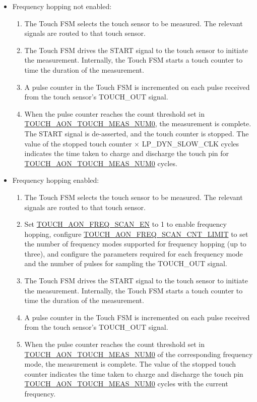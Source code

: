 \documentclass[main\_\_EN.tex]{subfiles}
\begin{document}
\begin{itemize}
    \item Frequency hopping not enabled:
        \begin{enumerate}
            \item The Touch FSM selects the touch sensor to be measured. The relevant signals are routed to that touch sensor.
            \item The Touch FSM drives the START signal to the touch sensor to initiate the measurement. Internally, the Touch FSM starts a touch counter to time the duration of the measurement.
            \item A pulse counter in the Touch FSM is incremented on each pulse received from the touch sensor's TOUCH\_OUT signal.
            \item When the pulse counter reaches the count threshold set in \hyperref[fielddesc:TOUCHAONTOUCHMEASNUM0]{TOUCH\_AON\_TOUCH\_MEAS\_NUM0}, the measurement is complete. The START signal is de-asserted, and the touch counter is stopped. The value of the stopped touch counter × LP\_DYN\_SLOW\_CLK cycles indicates the time taken to charge and discharge the touch pin for \hyperref[fielddesc:TOUCHAONTOUCHMEASNUM0]{TOUCH\_AON\_TOUCH\_MEAS\_NUM0} cycles.
        \end{enumerate}
    \item Frequency hopping enabled:
        \begin{enumerate}
            \item The Touch FSM selects the touch sensor to be measured. The relevant signals are routed to that touch sensor.
            \item Set \hyperref[fielddesc:TOUCHAONFREQSCANEN]{TOUCH\_AON\_FREQ\_SCAN\_EN} to 1 to enable frequency hopping, configure \hyperref[fielddesc:TOUCHAONFREQSCANCNTLIMIT]{TOUCH\_AON\_FREQ\_SCAN\_CNT\_LIMIT} to set the number of frequency modes supported for frequency hopping (up to three), and configure the parameters required for each frequency mode and the number of pulses for sampling the TOUCH\_OUT signal.
            \item The Touch FSM drives the START signal to the touch sensor to initiate the measurement. Internally, the Touch FSM starts a touch counter to time the duration of the measurement.
            \item A pulse counter in the Touch FSM is incremented on each pulse received from the touch sensor's TOUCH\_OUT signal.
            \item When the pulse counter reaches the count threshold set in \hyperref[fielddesc:TOUCHAONTOUCHMEASNUM0]{TOUCH\_AON\_TOUCH\_MEAS\_NUM0} of the corresponding frequency mode, the measurement is complete. The value of the stopped touch counter indicates the time taken to charge and discharge the touch pin \hyperref[fielddesc:TOUCHAONTOUCHMEASNUM0]{TOUCH\_AON\_TOUCH\_MEAS\_NUM0} cycles with the current frequency.

\end{enumerate}
\end{itemize}
\end{document}
